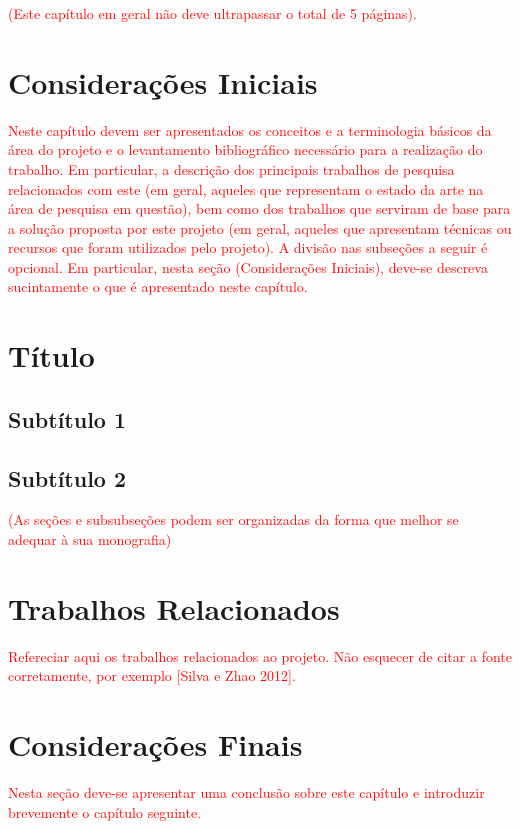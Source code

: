 \textcolor{red}{(Este capítulo em geral não deve ultrapassar o total de 5 páginas).}

\section{Considerações Iniciais}

\textcolor{red}{Neste capítulo devem ser apresentados os conceitos e a terminologia básicos da área do projeto e o levantamento bibliográfico necessário para a realização do trabalho. Em particular, a descrição dos principais trabalhos de pesquisa relacionados com este (em geral, aqueles que representam o estado da arte na área de pesquisa em questão), bem como dos trabalhos que serviram de base para a solução proposta por este projeto (em geral, aqueles que apresentam técnicas ou recursos que foram utilizados pelo projeto). A divisão nas subseções a seguir é opcional. Em particular, nesta seção (Considerações Iniciais), deve-se descreva sucintamente o que é apresentado neste capítulo.}

\section{Título}
\subsection{Subtítulo 1}
\subsection{Subtítulo 2}
\textcolor{red}{(As seções e subsubseções podem ser organizadas da forma que melhor se adequar à sua monografia)}

\section{Trabalhos Relacionados}

\textcolor{red}{Refereciar aqui os trabalhos relacionados ao projeto. Não esquecer de citar a fonte corretamente, por exemplo [Silva e Zhao 2012].}

\section{Considerações Finais}

\textcolor{red}{Nesta seção deve-se apresentar uma conclusão sobre este capítulo e introduzir brevemente o capítulo seguinte.}